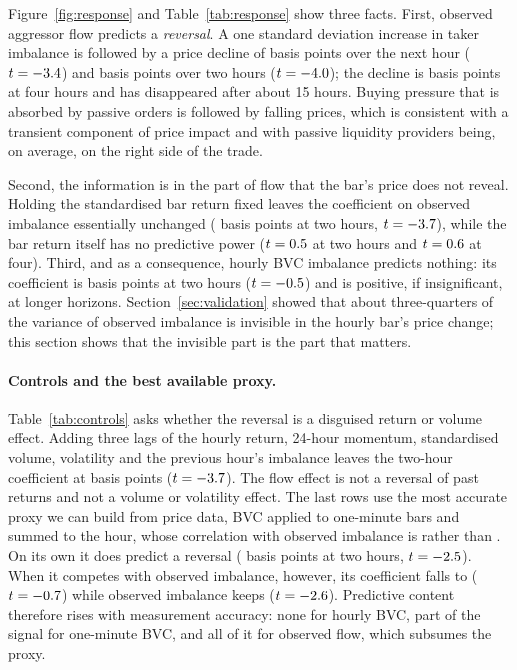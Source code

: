 Figure~\ref{fig:response} and Table~\ref{tab:response} show three facts. First, observed aggressor
flow predicts a \emph{reversal}. A one standard deviation increase in taker imbalance is followed by
a price decline of \BTCfrTakAone{} basis points over the next hour ($t=-3.4$) and \BTCfrTakAtwo{}
basis points over two hours ($t=-4.0$); the decline is \BTCfrTakAfour{} basis points at four
hours and has disappeared after about 15 hours. Buying pressure that is absorbed by passive orders is
followed by falling prices, which is consistent with a transient component of price impact
\citep{bouchaud2018} and with passive liquidity providers being, on average, on the right side of
the trade.

Second, the information is in the part of flow that the bar's price does not reveal. Holding the
standardised bar return fixed leaves the coefficient on observed imbalance essentially unchanged
(\BTCfrJointBtwo{} basis points at two hours, $t=-3.7$), while the bar return itself has no
predictive power ($t=0.5$ at two hours and $t=0.6$ at four). Third, and as a
consequence, hourly BVC imbalance predicts nothing: its coefficient is \BTCfrBvcBtwo{} basis points at
two hours ($t=-0.5$) and is positive, if insignificant, at longer horizons.
Section~\ref{sec:validation} showed that about three-quarters of the variance of observed imbalance
is invisible in the hourly bar's price change; this section shows that the invisible part is the part
that matters.

\paragraph{Controls and the best available proxy.} Table~\ref{tab:controls} asks whether the reversal
is a disguised return or volume effect. Adding three lags of the hourly return, 24-hour momentum,
standardised volume, volatility and the previous hour's imbalance leaves the two-hour coefficient at
\BTCrcctrlB{} basis points ($t=-3.7$). The flow effect is not a reversal of past returns and
not a volume or volatility effect. The last rows use the most accurate proxy we can build from price
data, BVC applied to one-minute bars and summed to the hour, whose correlation with observed
imbalance is \BTCbvcOneMinCorr{} rather than \BTCbvcCorr. On its own it does predict a reversal
(\BTCrcbvcmB{} basis points at two hours, $t=-2.5$). When it competes with observed imbalance,
however, its coefficient falls to \BTCrcvsBvcmB{} ($t=-0.7$) while observed imbalance keeps
\BTCrcvsTakB{} ($t=-2.6$). Predictive content therefore rises with measurement accuracy: none
for hourly BVC, part of the signal for one-minute BVC, and all of it for observed flow, which subsumes
the proxy.

